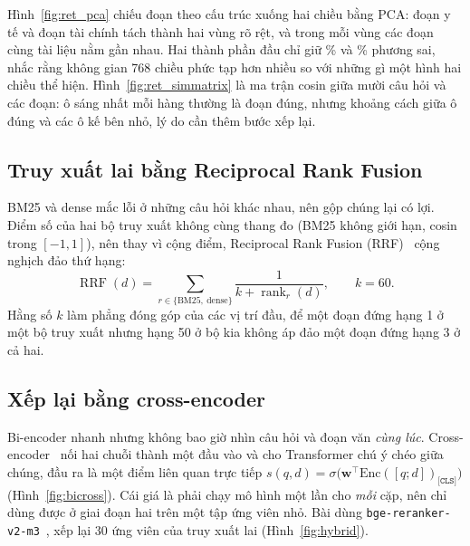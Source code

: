 Hình~\ref{fig:ret_pca} chiếu  đoạn theo cấu trúc xuống hai
chiều bằng PCA: đoạn y tế và đoạn tài chính tách thành hai vùng rõ rệt, và trong mỗi vùng các đoạn cùng tài liệu
nằm gần nhau. Hai thành phần đầu chỉ giữ \% và
\% phương sai, nhắc rằng không gian 768 chiều phức tạp hơn nhiều so
với những gì một hình hai chiều thể hiện. Hình~\ref{fig:ret_simmatrix} là ma trận cosin giữa mười câu hỏi và các
đoạn: ô sáng nhất mỗi hàng thường là đoạn đúng, nhưng khoảng cách giữa ô đúng và các ô kế bên nhỏ, lý do cần thêm
bước xếp lại.


\subsection{Truy xuất lai bằng Reciprocal Rank Fusion}
BM25 và dense mắc lỗi ở những câu hỏi khác nhau, nên gộp chúng lại có lợi. Điểm số của hai bộ truy xuất không
cùng thang đo (BM25 không giới hạn, cosin trong $[-1,1]$), nên thay vì cộng điểm, Reciprocal Rank Fusion
(RRF)~\cite{cormack2009rrf} cộng nghịch đảo thứ hạng:
\begin{equation}
  \operatorname{RRF}(d) = \sum_{r \in \{\text{BM25},\ \text{dense}\}} \frac{1}{k + \operatorname{rank}_r(d)}, \qquad k = 60.
\end{equation}
Hằng số $k$ làm phẳng đóng góp của các vị trí đầu, để một đoạn đứng hạng 1 ở một bộ truy xuất nhưng hạng 50 ở bộ
kia không áp đảo một đoạn đứng hạng 3 ở cả hai.


\subsection{Xếp lại bằng cross-encoder}
Bi-encoder nhanh nhưng không bao giờ nhìn câu hỏi và đoạn văn \emph{cùng lúc}. Cross-encoder~\cite{nogueira2019rerank}
nối hai chuỗi thành một đầu vào và cho Transformer chú ý chéo giữa chúng, đầu ra là một điểm liên quan trực tiếp
$s(q,d) = \sigma\bigl(\mathbf{w}^\top \mathrm{Enc}([q; d])_{\texttt{[CLS]}}\bigr)$ (Hình~\ref{fig:bicross}). Cái
giá là phải chạy mô hình một lần cho \emph{mỗi} cặp, nên chỉ dùng được ở giai đoạn hai trên một tập ứng viên nhỏ.
Bài dùng \texttt{bge-reranker-v2-m3}~\cite{chen2024bgem3}, xếp lại 30 ứng viên của truy xuất lai
(Hình~\ref{fig:hybrid}).


